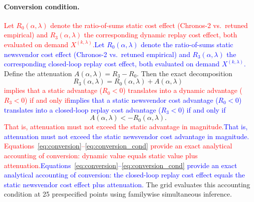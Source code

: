 \documentclass[msom,dblanonrev]{informs4}
\newcommand{\add}[1]{\textcolor{blue}{#1}}
\newcommand{\reduce}[1]{\textcolor{red}{#1}\hspace{0.5em}}
\begin{document}
\paragraph{Conversion condition.}
\reduce{Let $R_0(\alpha,\lambda)$ denote the ratio-of-sums static cost effect (Chronos-2 vs.\ retuned empirical) and $R_3(\alpha,\lambda)$ the corresponding dynamic replay cost effect, both evaluated on demand $X^{(k,\lambda)}$.}\add{Let $R_0(\alpha,\lambda)$ denote the ratio-of-sums static newsvendor cost effect (Chronos-2 vs.\ retuned empirical) and $R_3(\alpha,\lambda)$ the corresponding closed-loop replay cost effect, both evaluated on demand $X^{(k,\lambda)}$.}
Define the attenuation $A(\alpha,\lambda)=R_3-R_0$.
Then the exact decomposition
\begin{equation}\label{eq:conversion}
R_3(\alpha,\lambda)=R_0(\alpha,\lambda)+A(\alpha,\lambda)
\end{equation}
\reduce{implies that a static advantage ($R_0<0$) translates into a dynamic advantage ($R_3<0$) if and only if}\add{implies that a static newsvendor cost advantage ($R_0<0$) translates into a closed-loop replay cost advantage ($R_3<0$) if and only if}
\begin{equation}\label{eq:conversion_cond}
A(\alpha,\lambda)<-R_0(\alpha,\lambda).
\end{equation}
\reduce{That is, attenuation must not exceed the static advantage in magnitude.}\add{That is, attenuation must not exceed the static newsvendor cost advantage in magnitude.}
\reduce{Equations~\eqref{eq:conversion}--\eqref{eq:conversion_cond} provide an exact analytical accounting of conversion: dynamic value equals static value plus attenuation.}\add{Equations~\eqref{eq:conversion}--\eqref{eq:conversion_cond} provide an exact analytical accounting of conversion: the closed-loop replay cost effect equals the static newsvendor cost effect plus attenuation.}
The grid evaluates this accounting condition at 25 prespecified points using familywise simultaneous inference.
\end{document}
